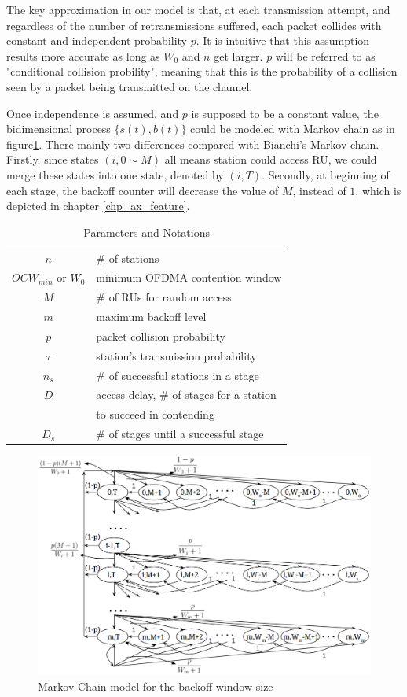The key approximation in our model is that, at each transmission attempt, and regardless of the number of retransmissions suffered, each packet collides with constant and independent probability $p$. It is intuitive that this assumption results more accurate as long as $W_0$ and $n$ get larger. $p$ will be referred to as "conditional collision probility", meaning that this is the probability of a collision seen by a packet being transmitted on the channel.

Once independence is assumed, and $p$ is supposed to be a constant value, the bidimensional process $\lbrace s(t),b(t) \rbrace$ could be modeled with Markov chain as in figure\ref{Markov}. 
There mainly two differences compared with Bianchi's Markov chain.
Firstly, since states $( i,0\sim M )$ all means station could access RU, we could merge these states into one state, denoted by $( i, T )$. 
Secondly, at beginning of each stage, the backoff counter will decrease the value of $M$, instead of $1$, which is depicted in chapter \ref{chp_ax_feature}.
\begin{table}[!b]
\caption{Parameters and Notations}
\centering
\label{table_notation}
\begin{tabular}{c|l}
\hline
$n$						& $\#$ of stations \\
$OCW_{min}$ or $W_0$		& minimum OFDMA contention window \\
$M$						& $\#$ of RUs for random access \\
$m$						& maximum backoff level \\
$p$						& packet collision probability \\
$\tau$					& station's transmission probability \\
$n_s$					& $\#$ of successful stations in a stage \\
$D$			            & access delay, $\#$ of stages for a station \\ & to succeed in contending \\
$D_s$					& $\#$ of stages until a successful stage \\
\hline
\end{tabular}
\end{table}

\begin{figure}[!t]
    \centering
\includegraphics[scale=.4]{./figure/chp3/Markov_chain.png}
\caption{Markov Chain model for the backoff window size}
\label{Markov}
\end{figure}

